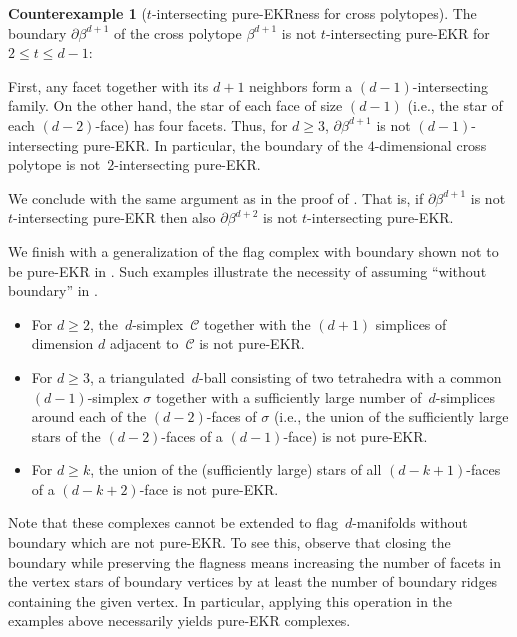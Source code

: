 \documentclass[a4paper,12pt]{amsart}
\theoremstyle{plain}
\theoremstyle{definition}
\newtheorem{counterexample}[theorem]{Counterexample}
\newcommand{\C}{\mathcal C}
\newcommand{\face}{\sigma}
\begin{document}
\begin{counterexample}[$t$-intersecting pure-EKRness for cross polytopes]
\label{exm:crosspolytopes}
  The boun\-dary $\partial \beta^{d+1}$ of the cross polytope $\beta^{d+1}$ is not $t$-intersecting pure-EKR for $2 \leq t \leq d-1$:

  First, any facet together with its $d+1$ neighbors form a $(d-1)$-intersecting family.
  On the other hand, the star of each face of size $(d-1)$ (i.e., the star of each $(d-2)$-face) has four facets.
  Thus, for $d \geq 3$, $\partial \beta^{d+1}$ is not $(d-1)$-intersecting pure-EKR.
  In particular, the boundary of the $4$-dimensional cross polytope is not~$2$-intersecting pure-EKR.

  We conclude with the same argument as in the proof of . That is, if $\partial \beta^{d+1}$ is not $t$-intersecting pure-EKR then also $\partial\beta^{d+2}$ is not $t$-intersecting pure-EKR.
\end{counterexample}

We finish with a generalization of the flag complex with boundary shown not to be pure-EKR in . Such examples illustrate the necessity of assuming ``without boundary'' in .

\begin{itemize}
    \item For $d\geq 2$, the~$d$-simplex~$\C$ together with the $(d+1)$ simplices of dimension $d$ adjacent to~$\C$ is not pure-EKR.
    \item For $d\geq 3$, a triangulated~$d$-ball consisting of two tetrahedra with a common $(d-1)$-simplex $\face$ together with a sufficiently large number of~$d$-simplices around each of the $(d-2)$-faces of $\face$ (i.e., the union of the sufficiently large stars of the $(d-2)$-faces of a $(d-1)$-face) is not pure-EKR.
    \item For $d \geq k$, the union of the (sufficiently large) stars of all $(d-k+1)$-faces of a $(d-k+2)$-face is not pure-EKR.
\end{itemize}

Note that these complexes cannot be extended to flag~$d$-manifolds without boundary which are not pure-EKR.
To see this, observe that closing the boundary while preserving the flagness means increasing the number of facets in the vertex stars of boundary vertices by at least the number of boundary ridges containing the given vertex.
In particular, applying this operation in the examples above necessarily yields pure-EKR complexes.




\end{document}
